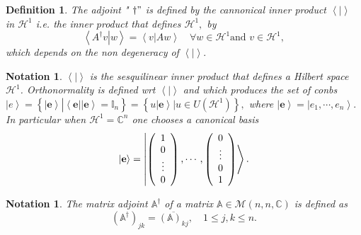 \documentclass[aps,preprint]{revtex4}%
\newtheorem{definition}[theorem]{Definition}
\newtheorem{notation}[theorem]{Notation}
\begin{document}
\begin{definition}
The \emph{adjoint} " $\dagger"$ is defined by the cannonical inner product
$\left\langle \left.  {}\right\vert \right\rangle $ in $\mathcal{H}^{1}$ i.e.
the inner product that defines $\mathcal{H}^{1},$ by
\begin{equation}
\left\langle \left.  A^{\dagger}v\right\vert w\right\rangle =\left\langle
\left.  v\right\vert Aw\right\rangle \quad\forall w\in\mathcal{H}^{1}\text{
and }v\in\mathcal{H}^{1},
\end{equation}
which depends on the non degeneracy of $\left\langle \left.  {}\right\vert
\right\rangle .$
\end{definition}

\begin{notation}
$\left\langle \left.  {}\right\vert \right\rangle $ is the sesquilinear inner
product that defines a Hilbert space $\mathcal{H}^{1}$. Orthonormality is
defined wrt $\left\langle \left.  {}\right\vert \right\rangle $ and which
produces the set of conbs $\left\vert e\right\rangle =\left\{  \left.
\overset{}{\left\vert \mathbf{e}\right\rangle }\right\vert \left\langle
\mathbf{e}\right\vert \left\vert \mathbf{e}\right\rangle =\mathbb{I}%
_{n}\right\}  =\left\{  \left.  u\left\vert \mathbf{e}\right\rangle
\right\vert u\in U\left(  \mathcal{H}^{1}\right)  \right\}  ,$ where
$\left\vert \mathbf{e}\right\rangle =\left\vert e_{1},\cdots,e_{n}%
\right\rangle .$ In particular when $\mathcal{H}^{1}=\mathbb{C}^{n}$ one
chooses a canonical basis
\begin{equation}
\left\vert \mathbf{e}\right\rangle =\left\vert \left(
\begin{array}
[c]{c}%
1\\
0\\
\vdots\\
0
\end{array}
\right)  ,\cdots,\left(
\begin{array}
[c]{c}%
0\\
\vdots\\
0\\
1
\end{array}
\right)  \right\rangle .
\end{equation}

\end{notation}

\begin{notation}
The matrix adjoint $\mathbb{A}^{\dagger}$ of a matrix $\mathbb{A}%
\in\mathcal{M}\left(  n,n,\mathbb{C}\right)  $ is defined as
\begin{equation}
\left(  \mathbb{A}^{\dagger}\right)  _{jk}=\overline{\left(  \mathbb{A}%
\right)  _{kj}},\quad1\leq j,k\leq n.
\end{equation}

\end{notation}
\end{document}

